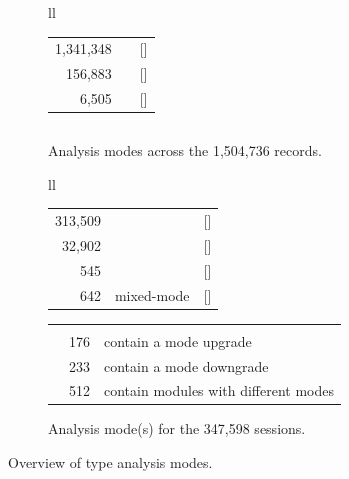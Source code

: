 \documentclass[english,submission,cleveref]{programming}
\begin{document}
\begin{figure}[t]\centering
  \begin{subfigure}[t]{\columnwidth}
    \begin{tabular}[t]{ll}
      \begin{tabular}[t]{r@{~~}l@{~}r}
         1,341,348 & \mnocheck{}          & [\pct{89.14}] \\
           156,883 & \mnonstrict{}        & [\pct{10.43}] \\
             6,505 & \mstrict{}           & [\pct{ 0.43}]
      \end{tabular}
      \begin{tabular}[t]{r@{~~}l@{~~}r}
      \end{tabular}
    \end{tabular}
    \caption{Analysis modes across the 1,504,736 records.}
    \label{f:total-records}
  \end{subfigure}

  \begin{subfigure}[t]{\columnwidth}
    \begin{tabular}[t]{ll} \\
      \begin{tabular}[t]{r@{~~}r@{~}r}
        313,509 & \mnocheck{}   & [\pct{90.19}] \\
         32,902 & \mnonstrict{} & [\pct{ 9.47}] \\
            545 & \mstrict{}    & [\pct{ 0.16}] \\
            642 & mixed-mode    & [\pct{ 0.18}]
      \end{tabular}
      \begin{tabular}[t]{l@{~~}ll}
        \zerowidth{Among the mixed-mode sessions:} \\
        & 176 & contain a mode upgrade \\
        & 233 & contain a mode downgrade \\
        & 512 & contain modules with different modes
      \end{tabular}
    \end{tabular}
    \caption{Analysis mode(s) for the 347,598 sessions.}
    \label{f:total-sessions}
  \end{subfigure}

  \caption{Overview of type analysis modes.}
  \label{f:dataset-overview}
\end{figure}
\end{document}
